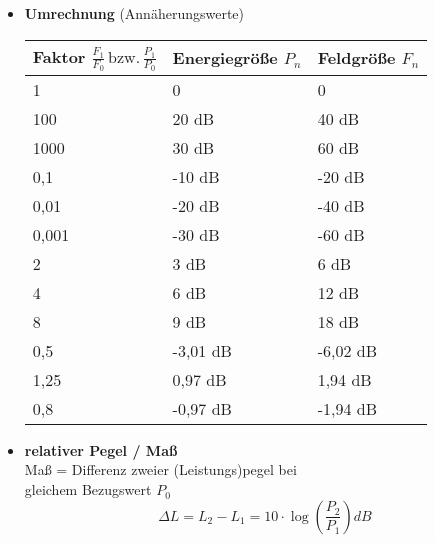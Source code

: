 \begin{itemize}
            \item \textbf{Umrechnung} (Annäherungswerte)
            \renewcommand\arraystretch{1.2}
            \begin{table}[H]
	            \begin{tabularx}{1\columnwidth}{l|X|X}
	            	\hline
            		Faktor $ \tfrac{F_1}{F_0} \, \text{bzw.} \, \tfrac{P_1}{P_0}$ & Energiegröße $P_n$ & Feldgröße $F_n$\\
            		\hline
            		1 & 0 & 0 \\
            		100 & 20 \si{dB} & 40 \si{dB} \\
            		1000 & 30 \si{dB} & 60  \si{dB} \\
            		0,1 & -10 \si{dB} & -20 \si{dB} \\
            		0,01 & -20 \si{dB} & -40 \si{dB} \\
            		0,001 & -30 \si{dB} & -60 \si{dB} \\
            		2 & 3 \si{dB} & 6 \si{dB} \\
            		4 & 6 \si{dB} & 12 \si{dB} \\
            		8 & 9 \si{dB} & 18 \si{dB} \\
            		0,5 & -3,01 \si{dB} & -6,02 \si{dB} \\
            		1,25 & 0,97 \si{dB} & 1,94 \si{dB} \\
            		0,8 & -0,97 \si{dB} & -1,94 \si{dB} \\
            		\hline
            	\end{tabularx}    
            \end{table}
        \item \textbf{relativer Pegel / Maß}\\
        Maß = Differenz zweier (Leistungs)pegel bei\\ gleichem Bezugswert $ P_0 $
        \begin{equation*}
        	\Delta L = L_2 - L_1 = 10 \cdot \log \left( \frac{P_2}{P_1}\right)  \si{dB}
        \end{equation*}
        \end{itemize}




